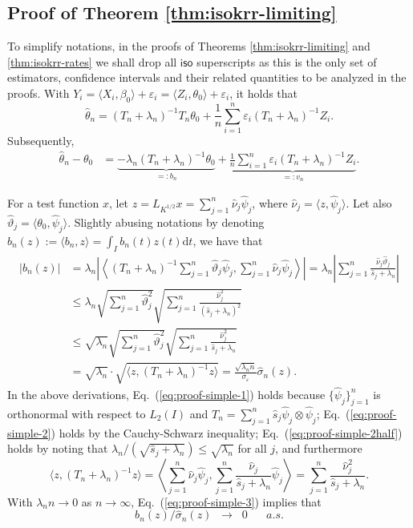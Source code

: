 \documentclass[11pt,a4paper]{article}
\renewcommand{\hat}{\widehat}
\theoremstyle{definition}
\theoremstyle{plain}
\theoremstyle{remark}
\newcommand{\ud}{\mathrm d}
\newcommand{\iso}{\mathsf{iso}}
\begin{document}
\subsection{Proof of Theorem \ref{thm:isokrr-limiting}}

To simplify notations, in the proofs of Theorems \ref{thm:isokrr-limiting} and \ref{thm:isokrr-rates} we shall drop all $\iso$ superscripts as this is the only set of estimators, confidence intervals and their related
quantities to be analyzed in the proofs.
With $Y_i=\langle X_i,\beta_0\rangle+\varepsilon_i = \langle Z_i,\theta_0\rangle+\varepsilon_i$, it holds that
$$
\hat\theta_n = (T_n+\lambda_n)^{-1}T_n\theta_0 + \frac{1}{n}\sum_{i=1}^n\varepsilon_i (T_n+\lambda_n)^{-1}Z_i.
$$
Subsequently,
\begin{align}
\hat\theta_n-\theta_0 &= \underbrace{-\lambda_n (T_n+\lambda_n)^{-1}\theta_0}_{=: b_n} + \underbrace{\frac{1}{n}\sum_{i=1}^n\varepsilon_i(T_n+\lambda_n)^{-1}Z_i}_{=:v_n}.
\end{align}

For a test function $x$, let $z=L_{K^{1/2}}x=\sum_{j=1}^{n}\hat\nu_j\hat\psi_j$, where $\hat\nu_j=\langle z,\hat\psi_j\rangle$.
Let also $\hat\vartheta_j = \langle\theta_0,\hat\psi_j\rangle$.
Slightly abusing notations by denoting $b_n(z) := \langle b_n,z\rangle = \int_I b_n(t)z(t)\ud t$, we have that
\begin{align}
\big|b_n(z)\big| &= \lambda_n\left|\left\langle(T_n+\lambda_n)^{-1}\sum_{j=1}^n\hat\vartheta_j\hat\psi_j, \sum_{j=1}^n\hat\nu_j\hat\psi_j\right\rangle\right|
= \lambda_n \left|\sum_{j=1}^n \frac{\hat\nu_j\hat\vartheta_j}{\hat s_j+\lambda_n}\right|\label{eq:proof-simple-1}\\
&\leq \lambda_n \sqrt{\sum_{j=1}^n\hat\vartheta_j^2}\sqrt{\sum_{j=1}^n\frac{\hat\nu_j^2}{(\hat s_j+\lambda_n)^2}} \label{eq:proof-simple-2}\\
&\leq \sqrt{\lambda_n}\sqrt{\sum_{j=1}^n\hat\vartheta_j^2}\sqrt{\sum_{j=1}^n\frac{\hat\nu_j^2}{\hat s_j+\lambda_n}}\label{eq:proof-simple-2half}\\
&= \sqrt{\lambda_n}\cdot \sqrt{\langle z,(T_n+\lambda_n)^{-1}z\rangle} = {\frac{\sqrt{\lambda_nn}}{\sigma_\varepsilon}\hat\sigma_n(z)}.\label{eq:proof-simple-3}
\end{align}
In the above derivations, Eq.~(\ref{eq:proof-simple-1}) holds because $\{\hat\psi_j\}_{j=1}^n$ is orthonormal with respect to $L_2(I)$ and $T_n=\sum_{j=1}^n\hat s_j\hat\psi_j\otimes\hat\psi_j$;
Eq.~(\ref{eq:proof-simple-2}) holds by the Cauchy-Schwarz inequality;
Eq.~(\ref{eq:proof-simple-2half}) holds by noting that $\lambda_n/(\sqrt{\hat s_j+\lambda_n})\leq\sqrt{\lambda_n}$ for all $j$, and furthermore
$$
\langle z, (T_n+\lambda_n)^{-1}z\rangle = \left\langle\sum_{j=1}^n\hat\nu_j\hat\psi_j, \sum_{j=1}^n\frac{\hat\nu_j}{\hat s_j+\lambda_n}\hat\psi_j\right\rangle = \sum_{j=1}^n\frac{\hat\nu_j^2}{\hat s_j+\lambda_n}.
$$
With $\lambda_n n\to 0$ as $n\to\infty$, Eq.~(\ref{eq:proof-simple-3}) implies that
$$
b_n(z)/\hat\sigma_n(z)\;\;\to\;\;0\;\;\;\;\;\;a.s.
$$
\end{document}

